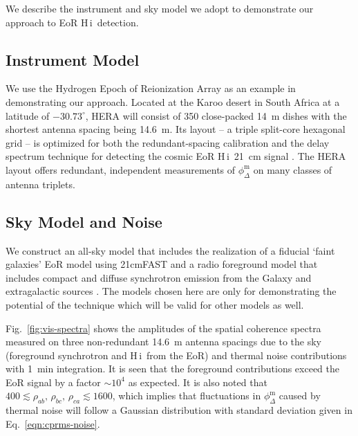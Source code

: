 \documentclass[
reprint,
superscriptaddress,
amsmath,
amssymb,
aps,
prd
]{revtex4-1}
\newcommand{\HI}{H\,{\sc i}}
\begin{document}
We describe the instrument and sky model we adopt to demonstrate our approach to EoR \HI\ detection. 

\subsection{Instrument Model}\label{sec:instrument}

We use the Hydrogen Epoch of Reionization Array \cite[HERA;][]{deb17,thy16,ewa16,neb16,patra17} as an example in demonstrating our approach. Located at the Karoo desert in South Africa at a latitude of $-30.73^\circ$, HERA will consist of 350 close-packed 14~m dishes with the shortest antenna spacing being 14.6~m. Its layout -- a triple split-core hexagonal grid -- is optimized for both the redundant-spacing calibration and the delay spectrum technique for detecting the cosmic EoR \HI\ 21~cm signal \cite{dil16}. The HERA layout offers redundant, independent measurements of $\phi_\Delta^\textrm{m}$ on many classes of antenna triplets. 

\subsection{Sky Model and Noise}\label{sec:skymodel-noise}

We construct an all-sky model that includes the realization of a fiducial `faint galaxies' EoR model \cite{gre17} using 21cmFAST \cite{mes11} and a radio foreground model that includes compact and diffuse synchrotron emission from the Galaxy and extragalactic sources \cite{thy15a}. The models chosen here are only for demonstrating the potential of the technique which will be valid for other models as well.

Fig.~\ref{fig:vis-spectra} shows the amplitudes of the spatial coherence spectra measured on three non-redundant 14.6~m antenna spacings due to the sky (foreground synchrotron and \HI\ from the EoR) and thermal noise contributions with 1~min integration. It is seen that the foreground contributions exceed the EoR signal by a factor $\sim 10^4$ as expected. It is also noted that $400\lesssim \rho_{ab},\,\rho_{bc},\,\rho_{ca} \lesssim 1600$, which implies that fluctuations in $\phi_\Delta^\textrm{m}$ caused by thermal noise will follow a Gaussian distribution with standard deviation given in Eq.~\ref{eqn:cprms-noise}.
\end{document}
